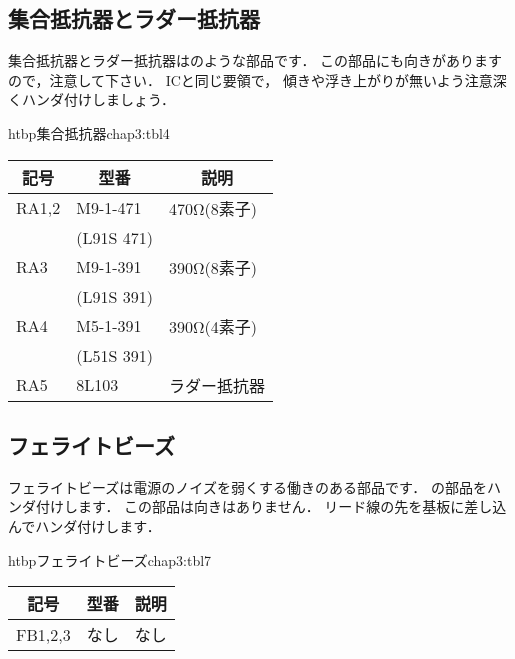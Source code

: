 
\newpage
\subsection{集合抵抗器とラダー抵抗器}
集合抵抗器とラダー抵抗器はのような部品です．
この部品にも向きがありますので，注意して下さい．
ICと同じ要領で，
傾きや浮き上がりが無いよう注意深くハンダ付けしましょう．

\begin{mytable}{htbp}{集合抵抗器}{chap3:tbl4}
\begin{tabular}{|l|l|l|}
\hline
\multicolumn{1}{|c|}{記号} &
\multicolumn{1}{c|}{型番} &
\multicolumn{1}{c|}{説明} \\
\hline
RA1,2 & M9-1-471 & 470Ω(8素子)  \\
      &(L91S 471)&               \\
RA3   & M9-1-391 & 390Ω(8素子)  \\
      &(L91S 391)&               \\
RA4   & M5-1-391 & 390Ω(4素子)  \\
      &(L51S 391)&               \\
RA5   & 8L103    & ラダー抵抗器 \\
\hline
\end{tabular}
\end{mytable}


\subsection{フェライトビーズ}
フェライトビーズは電源のノイズを弱くする働きのある部品です．
の部品をハンダ付けします．
この部品は向きはありません．
リード線の先を基板に差し込んでハンダ付けします．

\begin{mytable}{htbp}{フェライトビーズ}{chap3:tbl7}
\begin{tabular}{|l|l|l|}
\hline
\multicolumn{1}{|c|}{記号} &
\multicolumn{1}{c|}{型番} &
\multicolumn{1}{c|}{説明} \\
\hline
FB1,2,3 & なし & なし \\
\hline
\end{tabular}
\end{mytable}


